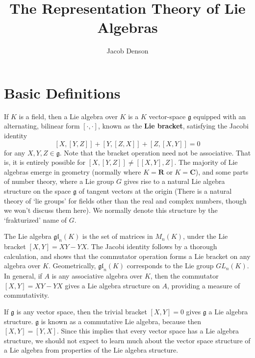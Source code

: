

\title{The Representation Theory of Lie Algebras}
\author{Jacob Denson}




\maketitle

\tableofcontents


\chapter{Basic Definitions}

If $K$ is a field, then a Lie algebra over $K$ is a $K$ vector-space $\mathfrak{g}$ equipped with an alternating, bilinear form $[\cdot, \cdot]$, known as the {\bf Lie bracket}, satisfying the Jacobi identity
%
\[ [X,[Y,Z]] + [Y,[Z,X]] + [Z,[X,Y]] = 0 \]
%
for any $X,Y,Z \in \mathfrak{g}$. Note that the bracket operation need not be associative. That is, it is entirely possible for $[X,[Y,Z]] \neq [[X,Y],Z]$. The majority of Lie algebras emerge in geometry (normally where $K = \mathbf{R}$ or $K = \mathbf{C}$), and some parts of number theory, where a Lie group $G$ gives rise to a natural Lie algebra structure on the space $\mathfrak{g}$ of tangent vectors at the origin (There is a natural theory of `lie groups' for fields other than the real and complex numbers, though we won't discuss them here). We normally denote this structure by the `frakturized' name of $G$.

\begin{example}
    The Lie algebra $\mathfrak{gl}_n(K)$ is the set of matrices in $M_n(K)$, under the Lie bracket $[X,Y] = XY - YX$. The Jacobi identity follows by a thorough calculation, and shows that the commutator operation forms a Lie bracket on any algebra over $K$. Geometrically, $\mathfrak{gl}_n(K)$ corresponds to the Lie group $GL_n(K)$. In general, if $A$ is any associative algebra over $K$, then the commutator $[X,Y] = XY - YX$ gives a Lie algebra structure on $A$, providing a measure of commutativity.
\end{example}

\begin{example}
    If $\mathfrak{g}$ is any vector space, then the trivial bracket $[X,Y] = 0$ gives $\mathfrak{g}$ a Lie algebra structure. $\mathfrak{g}$ is known as a commutative Lie algebra, because then $[X,Y] = [Y,X]$. Since this implies that every vector space has a Lie algebra structure, we should not expect to learn much about the vector space structure of a Lie algebra from properties of the Lie algebra structure.
\end{example}


